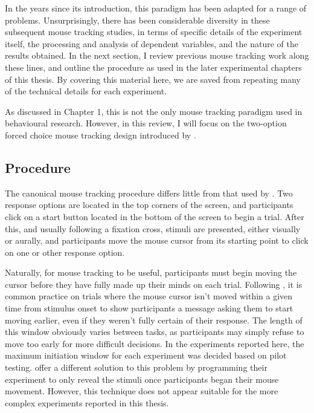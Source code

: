 In the years since its introduction,
this paradigm has been adapted for a range of problems.
Unsurprisingly, there has been considerable diversity in these subsequent mouse tracking studies,
in terms of specific details of the experiment itself,
the processing and analysis of dependent variables,
and the nature of the results obtained.
In the next section, I review previous mouse tracking work along these lines,
and outline the procedure as used in the later experimental chapters of this thesis.
By covering this material here, we are saved from repeating
many of the technical details for each experiment.

As discussed in Chapter 1,
this is not the only mouse tracking paradigm used in behavioural research.
However, in this review, I will focus on the two-option forced choice
mouse tracking design introduced  by \citet{Spivey2005}.


\subsection{Procedure}\label{sec:chapter2-mousetracking-procedure}

The canonical mouse tracking procedure differs little
from that used by \citet{Spivey2005}.
Two response options are located in the top corners of the screen,
and participants click on a start button 
located in the bottom of the screen to begin a trial.
After this, and usually following a fixation cross,
stimuli are presented, either visually or aurally,
and participants move the mouse cursor from its starting point
to click on one or other response option.

Naturally, for mouse tracking to be useful,
participants must begin moving the cursor
before they have fully made up their minds on each trial.
Following \citet{Freeman2009}, it is common practice
on trials where the mouse cursor isn't moved within a given time from
stimulus onset \citep[400 msec in][]{Freeman2009}
to show participants a message asking them to
start moving earlier, even if they weren't fully certain of their response.
The length of this window obviously varies between tasks,
as participants may simply refuse to move too early 
for more difficult decisions.
In the experiments reported here, the maximum initiation window
for each experiment was decided based on pilot testing.
\citet{Scherbaum2010} offer a different solution to this problem
by programming their experiment to only reveal the stimuli
once participants began their mouse movement.
However, this technique does not appear
suitable for the more complex experiments reported in this thesis.

